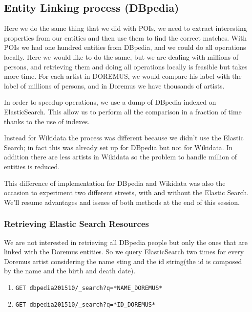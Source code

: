 \documentclass[paper=a4, fontsize=11pt]{scrartcl}
\begin{document}
\subsection{Entity Linking process (DBpedia)}
Here we do the same thing that we did with POIs, we need to extract interesting properties from our entities and then use them to find the correct matches. 
With POIs we had one hundred entities from DBpedia, and we could do all operations locally. Here we would like to do the same, but we are dealing with millions of persons, and retrieving them and doing all operations locally is feasible but takes more time. For each artist in DOREMUS, we would compare his label with the label of millions of persons, and in Doremus we have thousands of artists.

In order to speedup operations, we use a dump of DBpedia indexed on ElasticSearch. This allow us to perform all the comparison in a fraction of time thanks to the use of indexes.

Instead for Wikidata the process was different because we didn't use the Elastic Search; in fact this was already set up for DBpedia but not for Wikidata. In addition there are less artists in Wikidata so the problem to handle million of entities is reduced.

This difference of implementation for DBpedia and Wikidata was also the occasion to experiment two different streets, with and without the Elastic Search. We'll resume advantages and issues of both methods at the end of this session.

\subsubsection{Retrieving Elastic Search Resources}
We are not interested in retrieving all DBpedia people but only the ones that are linked with the Doremus entities. So we query ElasticSearch two times for every Doremus artist considering the name sting and the id string(the id is composed by the name and the birth and death date).

\begin{enumerate}

\item \begin{verbatim}GET dbpedia201510/_search?q=*NAME_DOREMUS*\end{verbatim}
\item \begin{verbatim}GET dbpedia201510/_search?q=*ID_DOREMUS*\end{verbatim}

\end{enumerate}
\end{document}
